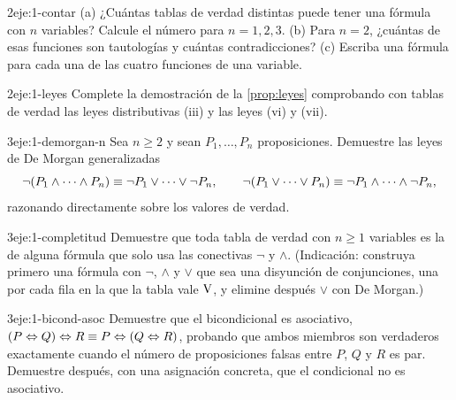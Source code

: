 \begin{ejercicio}{2}{eje:1-contar}
(a) ¿Cuántas tablas de verdad distintas puede tener una fórmula con $n$ variables? Calcule el número para $n=1,2,3$. (b) Para $n=2$, ¿cuántas de esas funciones son tautologías y cuántas contradicciones? (c) Escriba una fórmula para cada una de las cuatro funciones de una variable.
\end{ejercicio}

\begin{ejercicio}{2}{eje:1-leyes}
Complete la demostración de la \cref{prop:leyes} comprobando con tablas de verdad las leyes distributivas (iii) y las leyes (vi) y (vii).
\end{ejercicio}

\begin{ejercicio}{3}{eje:1-demorgan-n}
Sea $n\ge 2$ y sean $P_1,\dots,P_n$ proposiciones. Demuestre las leyes de De Morgan generalizadas
\[
\neg(P_1\wedge\dots\wedge P_n)\equiv\neg P_1\vee\dots\vee\neg P_n,\qquad
\neg(P_1\vee\dots\vee P_n)\equiv\neg P_1\wedge\dots\wedge\neg P_n,
\]
razonando directamente sobre los valores de verdad.
\end{ejercicio}

\begin{ejercicio}{3}{eje:1-completitud}
Demuestre que toda tabla de verdad con $n\ge 1$ variables es la de alguna fórmula que solo usa las conectivas $\neg$ y $\wedge$. (Indicación: construya primero una fórmula con $\neg$, $\wedge$ y $\vee$ que sea una disyunción de conjunciones, una por cada fila en la que la tabla vale $\mathrm{V}$, y elimine después $\vee$ con De Morgan.)
\end{ejercicio}

\begin{ejercicio}{3}{eje:1-bicond-asoc}
Demuestre que el bicondicional es asociativo, $(P\Leftrightarrow Q)\Leftrightarrow R\equiv P\Leftrightarrow(Q\Leftrightarrow R)$, probando que ambos miembros son verdaderos exactamente cuando el número de proposiciones falsas entre $P$, $Q$ y $R$ es par. Demuestre después, con una asignación concreta, que el condicional no es asociativo.
\end{ejercicio}
